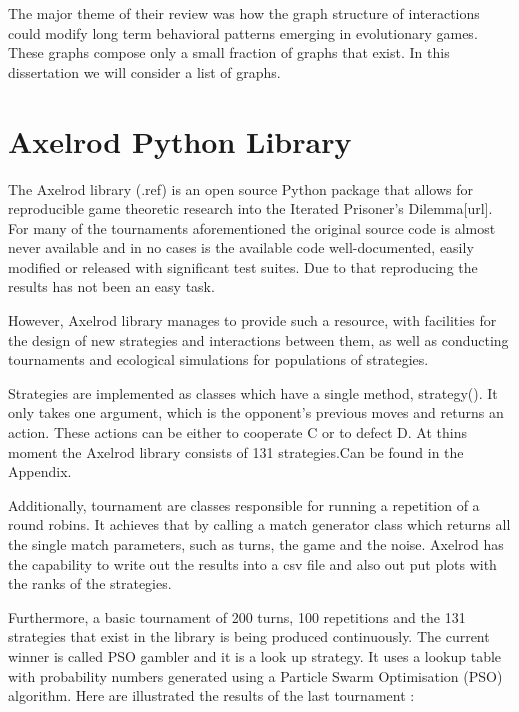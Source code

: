 The major theme of their review was how the graph structure of interactions could
modify long term behavioral patterns emerging in evolutionary games.
These graphs compose only a small fraction of graphs that exist. In this
dissertation we will consider a list of graphs.

\section{Axelrod Python Library}

The Axelrod library (.ref) is an open source Python package that allows for
reproducible game theoretic research into the Iterated Prisoner's Dilemma[url].
For many of the tournaments aforementioned the original source code is almost never
available and in no cases is the available code well-documented, easily modified
or released with significant test suites. Due to that reproducing the results
has not been an easy task.

However, Axelrod library manages to provide such a resource, with facilities for
the design of new strategies and interactions between them, as well as
conducting tournaments and ecological simulations for populations of strategies.

Strategies are implemented as classes which have a single method, strategy().
It only takes one argument, which is the opponent's previous moves and returns
an action. These actions can be either to cooperate C or to defect D. At thins
moment the Axelrod library consists of 131 strategies.Can be found in the Appendix.

Additionally, tournament are classes responsible for running a repetition of a
round robins. It achieves that by calling a match generator class which
returns all the single match parameters, such as turns, the game and the noise.
Axelrod has the capability to write out the results into a csv file and also out
put plots with the ranks of the strategies.

Furthermore, a basic tournament of 200 turns, 100 repetitions and the 131
strategies that exist in the library is being produced continuously. The current
winner is called PSO gambler and it is a look up strategy. It uses a lookup
table with probability numbers generated using a Particle Swarm Optimisation
(PSO) algorithm.  Here are illustrated the results of the last tournament :

